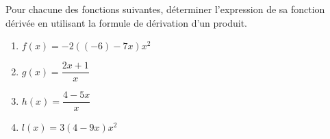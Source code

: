 \documentclass[11pt]{article}
\begin{document}
\begin{exercice}[3]
Pour chacune des fonctions suivantes, déterminer l'expression de sa
fonction dérivée en utilisant la formule de dérivation d'un produit.
\begin{multicols}{2}
\begin{enumerate}[label=\arabic*)]
	\item $f(x)=-2((-6)-7x)x^2$ 
	\item $g(x)=\dfrac{2x+1}{x}$ 
	\item $h(x)=\dfrac{4-5x}{x}$ 
	\item $l(x)=3(4-9x)x^2$
\end{enumerate}
\end{multicols}
\end{exercice}
\end{document}

